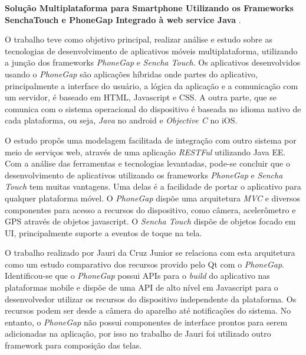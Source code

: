 \textbf{Solução Multiplataforma para Smartphone Utilizando os Frameworks SenchaTouch e PhoneGap Integrado à web service Java} \cite{jauridacruzjunior}.\par
O trabalho teve como objetivo principal, realizar análise e estudo sobre as tecnologias de desenvolvimento de aplicativos móveis multiplataforma, utilizando a junção dos frameworks \textit{PhoneGap} e \textit{Sencha Touch}. Os aplicativos desenvolvidos usando o \textit{PhoneGap} são aplicações híbridas onde partes do aplicativo, principalmente a interface do usuário, a lógica da aplicação e a comunicação com um servidor, é baseado em HTML, Javascript e CSS. A outra parte, que se comunica com o sistema operacional do dispositivo é baseada no idioma nativo de cada plataforma, ou seja, \textit{Java} no android e \textit{Objective C} no iOS.\par
O estudo propôs uma modelagem facilitada de integração com outro sistema por meio de serviços web, através de uma aplicação \textit{RESTFul} utilizando Java EE. Com a análise das ferramentas e tecnologias levantadas, pode-se concluir que o desenvolvimento de aplicativos utilizando os frameworks \textit{PhoneGap} e \textit{Sencha Touch} tem muitas vantagens. Uma delas é a facilidade de portar o aplicativo para qualquer plataforma móvel. O  \textit{PhoneGap} dispõe uma arquitetura \textit{MVC} e diversos componentes para acesso a recursos do dispositivo, como câmera, acelerômetro e GPS através de objetos javascript. O \textit{Sencha Touch} dispõe de objetos focado em UI, principalmente suporte a eventos de toque na tela.\par

O trabalho realizado por Jauri da Cruz Junior se relaciona com esta arquitetura como um estudo comparativo dos recursos provido pelo Qt com o \textit{PhoneGap}. Identificou-se que o \textit{PhoneGap} possui APIs para o \textit{build} do aplicativo nas plataformas mobile e dispõe de uma API de alto nível em Javascript para o desenvolvedor utilizar os recursos do dispositivo independente da plataforma. Os recursos podem ser desde a câmera do aparelho até notificações do sistema. No entanto, o \textit{PhoneGap} não possui componentes de interface prontos para serem adicionadas na aplicação, por isso no trabalho de Jauri foi utilizado outro framework para composição das telas.\par


